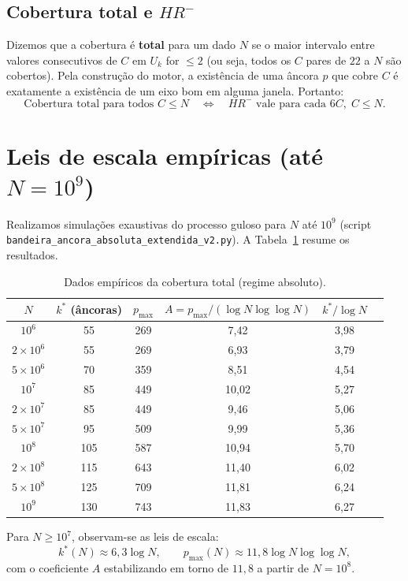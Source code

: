 \documentclass[11pt]{article}
\theoremstyle{definition}
\begin{document}
	\subsection{Cobertura total e $HR^-$}
	Dizemos que a cobertura é \textbf{total} para um dado $N$ se o maior intervalo entre valores consecutivos de $C$ em $U_k$ for $\le 2$ (ou seja, todos os $C$ pares de $22$ a $N$ são cobertos). Pela construção do motor, a existência de uma âncora $p$ que cobre $C$ é exatamente a existência de um eixo bom em alguma janela. Portanto:
	\[
	\text{Cobertura total para todos } C\le N \quad\Longleftrightarrow\quad HR^-\text{ vale para cada } 6C,\;C\le N.
	\]
	
	\section{Leis de escala empíricas (até $N=10^9$)}
	
	Realizamos simulações exaustivas do processo guloso para $N$ até $10^9$ (script \texttt{bandeira\_ancora\_absoluta\_extendida\_v2.py}). A Tabela~\ref{tab:dados} resume os resultados.
	
	\begin{table}[h]
		\centering
		\caption{Dados empíricos da cobertura total (regime absoluto).}
		\label{tab:dados}
		\begin{tabular}{cccccc}
			\toprule
			$N$ & $k^*$ (âncoras) & $p_{\max}$ & $A = p_{\max}/(\log N\log\log N)$ & $k^*/\log N$ \\
			\midrule
			$10^6$      &  55 & 269 & 7,42 & 3,98 \\
			$2\times10^6$&  55 & 269 & 6,93 & 3,79 \\
			$5\times10^6$&  70 & 359 & 8,51 & 4,54 \\
			$10^7$      &  85 & 449 & 10,02& 5,27 \\
			$2\times10^7$&  85 & 449 & 9,46 & 5,06 \\
			$5\times10^7$&  95 & 509 & 9,99 & 5,36 \\
			$10^8$      & 105 & 587 & 10,94& 5,70 \\
			$2\times10^8$& 115 & 643 & 11,40& 6,02 \\
			$5\times10^8$& 125 & 709 & 11,81& 6,24 \\
			$10^9$      & 130 & 743 & 11,83& 6,27 \\
			\bottomrule
		\end{tabular}
	\end{table}
	
	Para $N\ge10^7$, observam-se as leis de escala:
	\[
	k^*(N) \approx 6{,}3\log N,\qquad 
	p_{\max}(N) \approx 11{,}8\log N\log\log N,
	\]
	com o coeficiente $A$ estabilizando em torno de $11,8$ a partir de $N=10^8$.
	
\end{document}
